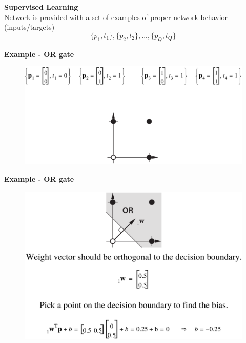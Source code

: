 \documentclass[10pt, compress]{beamer}
\begin{document}
\begin{frame}
  \vspace{1cm}
  \textbf{Supervised Learning} \\
  Network is provided with a set of examples of proper network behavior (inputs/targets)
  $$\{p_1, t_1\}, \{p_2, t_2\}, ..., \{p_Q, t_Q\}$$

  \textbf{Example - OR gate} \\ \hfill \break
  \vspace{-.6cm}
  \begin{figure}
    \includegraphics[width=.9\linewidth]{imgs/perceptron_or}
  \end{figure}
\end{frame}

\begin{frame}
  \vspace{1cm}
  \textbf{Example - OR gate}
  \begin{figure}
    \includegraphics[width=.9\linewidth]{imgs/perceptron_or_2}
  \end{figure}
\end{frame}
\end{document}
